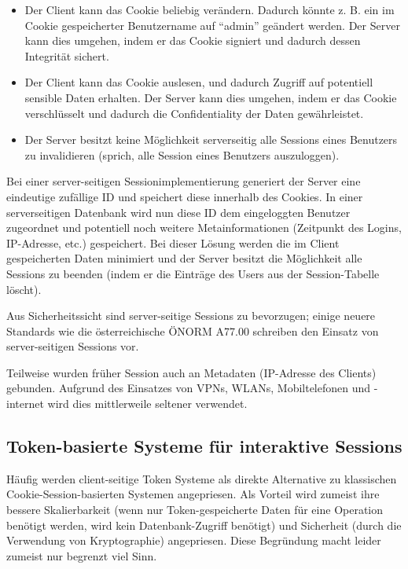 \begin{itemize}
		\item Der Client kann das Cookie beliebig verändern. Dadurch könnte z. B. ein im Cookie gespeicherter Benutzername auf ``admin'' geändert werden. Der Server kann dies umgehen, indem er das Cookie signiert und dadurch dessen Integrität sichert.
	\item Der Client kann das Cookie auslesen, und dadurch Zugriff auf potentiell sensible Daten erhalten. Der Server kann dies umgehen, indem er das Cookie verschlüsselt und dadurch die Confidentiality der Daten gewährleistet.
	\item Der Server besitzt keine Möglichkeit serverseitig alle Sessions eines Benutzers zu invalidieren (sprich, alle Session eines Benutzers auszuloggen).
\end{itemize}

Bei einer server-seitigen Sessionimplementierung generiert der Server eine eindeutige zufällige ID und speichert diese innerhalb des Cookies. In einer serverseitigen Datenbank wird nun diese ID dem eingeloggten Benutzer zugeordnet und potentiell noch weitere Metainformationen (Zeitpunkt des Logins, IP-Adresse, etc.) gespeichert. Bei dieser Lösung werden die im Client gespeicherten Daten minimiert und der Server besitzt die Möglichkeit alle Sessions zu beenden (indem er die Einträge des Users aus der Session-Tabelle löscht).

Aus Sicherheitssicht sind server-seitige Sessions zu bevorzugen; einige neuere Standards wie die österreichische ÖNORM A77.00 schreiben den Einsatz von server-seitigen Sessions vor.

Teilweise wurden früher Session auch an Metadaten (IP-Adresse des Clients) gebunden. Aufgrund des Einsatzes von VPNs, WLANs, Mobiltelefonen und -internet wird dies mittlerweile seltener verwendet.


\subsection{Token-basierte Systeme für interaktive Sessions}

Häufig werden client-seitige Token Systeme als direkte Alternative zu klassischen Cookie-Session-basierten Systemen angepriesen. Als Vorteil wird zumeist ihre bessere Skalierbarkeit (wenn nur Token-gespeicherte Daten für eine Operation benötigt werden, wird kein Datenbank-Zugriff benötigt) und Sicherheit (durch die Verwendung von Kryptographie) angepriesen. Diese Begründung macht leider zumeist nur begrenzt viel Sinn.

